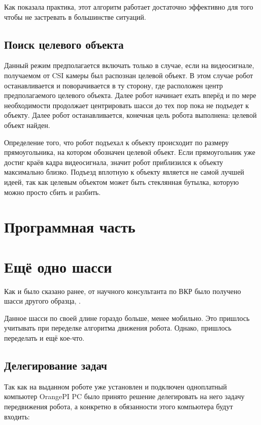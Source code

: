 Как показала практика, этот алгоритм работает достаточно эффективно для того чтобы не застревать в большинстве ситуаций.

\subsection{Поиск целевого объекта}

Данный режим предполагается включать только в случае, если на видеосигнале, получаемом от CSI камеры был распознан целевой объект. В этом случае робот останавливается и поворачивается в ту сторону, где расположен центр предполагаемого целевого объекта. Далее робот начинает ехать вперёд и по мере необходимости продолжает центрировать шасси до тех пор пока не подъедет к объекту. Далее робот останавливается, конечная цель робота выполнена: целевой объект найден.

Определение того, что робот подъехал к объекту происходит по размеру прямоугольника, на котором обозначен целевой объект. Если прямоугольник уже достиг краёв кадра видеосигнала, значит робот приблизился к объекту максимально близко. Подъезд вплотную к объекту является не самой лучшей идеей, так как целевым объектом может быть стеклянная бутылка, которую можно просто сбить и разбить. 

\section{Программная часть}

\section{Ещё одно шасси}
Как и было сказано ранее, от научного консультанта по ВКР было получено шасси другого образца, .

Данное шасси по своей длине гораздо больше, менее мобильно. Это пришлось учитывать при переделке алгоритма движения робота. Однако, пришлось переделать и ещё кое-что.

\subsection{Делегирование задач}

Так как на выданном роботе уже установлен и подключен одноплатный компьютер OrangePI PC было принято решение делегировать на него задачу передвижения робота, а конкретно в обязанности этого компьютера будут входить:

